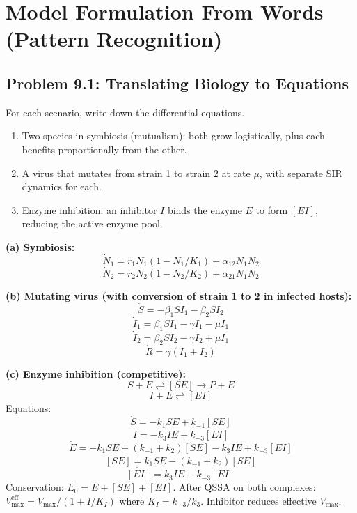 \documentclass[10pt]{article}
\begin{document}
\newpage
\section{Model Formulation From Words (Pattern Recognition)}

\subsection{Problem 9.1: Translating Biology to Equations}

\begin{problem}
For each scenario, write down the differential equations.
\begin{enumerate}[label=(\alph*)]
\item Two species in symbiosis (mutualism): both grow logistically, plus each benefits proportionally from the other.
\item A virus that mutates from strain 1 to strain 2 at rate $\mu$, with separate SIR dynamics for each.
\item Enzyme inhibition: an inhibitor $I$ binds the enzyme $E$ to form $[EI]$, reducing the active enzyme pool.
\end{enumerate}
\end{problem}

\begin{solution}
\textbf{(a) Symbiosis:}
\[
\dot N_1 = r_1 N_1 (1 - N_1/K_1) + \alpha_{12} N_1 N_2
\]
\[
\dot N_2 = r_2 N_2 (1 - N_2/K_2) + \alpha_{21} N_1 N_2
\]

\textbf{(b) Mutating virus (with conversion of strain 1 to 2 in infected hosts):}
\[
\dot S = -\beta_1 S I_1 - \beta_2 S I_2
\]
\[
\dot I_1 = \beta_1 S I_1 - \gamma I_1 - \mu I_1
\]
\[
\dot I_2 = \beta_2 S I_2 - \gamma I_2 + \mu I_1
\]
\[
\dot R = \gamma(I_1 + I_2)
\]

\textbf{(c) Enzyme inhibition (competitive):}
\[
S + E \rightleftharpoons [SE] \to P + E
\]
\[
I + E \rightleftharpoons [EI]
\]
Equations:
\[
\dot S = -k_1 SE + k_{-1}[SE]
\]
\[
\dot I = -k_3 IE + k_{-3}[EI]
\]
\[
\dot E = -k_1 SE + (k_{-1}+k_2)[SE] - k_3 IE + k_{-3}[EI]
\]
\[
\dot{[SE]} = k_1 SE - (k_{-1}+k_2)[SE]
\]
\[
\dot{[EI]} = k_3 IE - k_{-3}[EI]
\]
Conservation: $E_0 = E + [SE] + [EI]$. After QSSA on both complexes: $V_\text{max}^\text{eff} = V_\text{max}/(1 + I/K_I)$ where $K_I = k_{-3}/k_3$. Inhibitor reduces effective $V_\text{max}$.
\end{solution}
\end{document}
